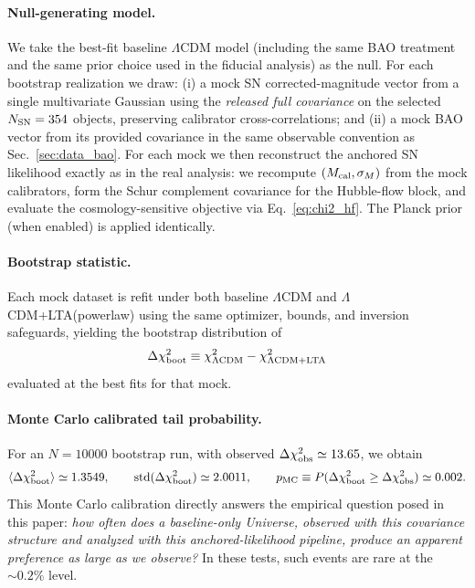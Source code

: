 \documentclass[10pt]{article}
\begin{document}
\paragraph{Null-generating model.}
We take the best-fit baseline $\Lambda$CDM model (including the same BAO treatment and the same
prior choice used in the fiducial analysis) as the null. For each bootstrap realization we draw:
(i) a mock SN corrected-magnitude vector from a single multivariate Gaussian using the
\emph{released full covariance} on the selected \(N_{\rm SN}=354\) objects, preserving calibrator
cross-correlations; and (ii) a mock BAO vector from its provided covariance in the same observable
convention as Sec.~\ref{sec:data_bao}. For each mock we then reconstruct the anchored SN likelihood
exactly as in the real analysis: we recompute \((M_{\rm cal},\sigma_M)\) from the mock calibrators,
form the Schur complement covariance for the Hubble-flow block, and evaluate the cosmology-sensitive
objective via Eq.~\eqref{eq:chi2_hf}. The Planck prior (when enabled) is applied identically.

\paragraph{Bootstrap statistic.}
Each mock dataset is refit under both baseline $\Lambda$CDM and $\Lambda$CDM+LTA(powerlaw) using the
same optimizer, bounds, and inversion safeguards, yielding the bootstrap distribution of
\begin{equation}
\Delta\chi^2_{\rm boot} \equiv
\chi^2_{\Lambda\mathrm{CDM}} - \chi^2_{\Lambda\mathrm{CDM+LTA}}
\end{equation}
evaluated at the best fits for that mock.

\paragraph{Monte Carlo calibrated tail probability.}
For an \(N=10000\) bootstrap run, with observed
\(\Delta\chi^2_{\rm obs}\simeq 13.65\), we obtain
\begin{equation}
\langle \Delta\chi^2_{\rm boot}\rangle \simeq 1.3549, \qquad
\mathrm{std}(\Delta\chi^2_{\rm boot}) \simeq 2.0011, \qquad
p_{\rm MC}\equiv P(\Delta\chi^2_{\rm boot}\ge \Delta\chi^2_{\rm obs}) \simeq 0.002.
\end{equation}
This Monte Carlo calibration directly answers the empirical question posed in this paper:
\emph{how often does a baseline-only Universe, observed with this covariance structure and analyzed
with this anchored-likelihood pipeline, produce an apparent preference as large as we observe?}
In these tests, such events are rare at the \(\sim 0.2\%\) level.
\end{document}
